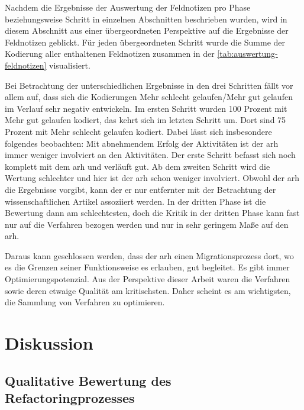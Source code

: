 Nachdem die Ergebnisse der Auswertung der Feldnotizen pro Phase beziehungsweise Schritt in einzelnen Abschnitten beschrieben wurden, wird in diesem Abschnitt aus einer übergeordneten Perspektive auf die Ergebnisse der Feldnotizen geblickt.
Für jeden übergeordneten Schritt wurde die Summe der Kodierung aller enthaltenen Feldnotizen zusammen in der \cref{tab:auswertung-feldnotizen} visualisiert.


Bei Betrachtung der unterschiedlichen Ergebnisse in den drei Schritten fällt vor allem auf, dass sich die Kodierungen \glqq Mehr schlecht gelaufen\grqq{}/\glqq Mehr gut gelaufen\grqq{} im Verlauf sehr negativ entwickeln.
Im ersten Schritt wurden 100 Prozent mit \glqq Mehr gut gelaufen\grqq{} kodiert, das kehrt sich im letzten Schritt um.
Dort sind 75 Prozent mit \glqq Mehr schlecht gelaufen\grqq{} kodiert.
Dabei lässt sich insbesondere folgendes beobachten: Mit abnehmendem Erfolg der Aktivitäten ist der \gls{arh} immer weniger involviert an den Aktivitäten.
Der erste Schritt befasst sich noch komplett mit dem \gls{arh} und verläuft gut.
Ab dem zweiten Schritt wird die Wertung schlechter und hier ist der \gls{arh} schon weniger involviert.
Obwohl der \gls{arh} die Ergebnisse vorgibt, kann der er nur entfernter mit der Betrachtung der wissenschaftlichen Artikel assoziiert werden.
In der dritten Phase ist die Bewertung dann am schlechtesten, doch die Kritik in der dritten Phase kann fast nur auf die Verfahren bezogen werden und nur in sehr geringem Maße auf den \gls{arh}.

Daraus kann geschlossen werden, dass der \gls{arh} einen Migrationsprozess dort, wo es die Grenzen seiner Funktionsweise es erlauben, gut begleitet.
Es gibt immer Optimierungspotenzial.
Aus der Perspektive dieser Arbeit waren die Verfahren sowie deren etwaige Qualität am kritischsten. 
Daher scheint es am wichtigsten, die Sammlung von Verfahren zu optimieren.

\section{Diskussion}
\label{sec:auswertung-diskussion}

\subsection{Qualitative Bewertung des Refactoringprozesses}


